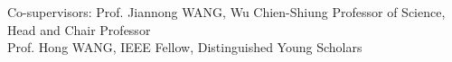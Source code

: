 \documentclass{article}
\begin{document}
Co-supervisors: Prof. Jiannong WANG, Wu Chien-Shiung Professor of Science, Head and Chair Professor \\
\makebox[3cm][l]{\hspace{0pt}} Prof. Hong WANG, IEEE Fellow, Distinguished Young Scholars
\end{document}
